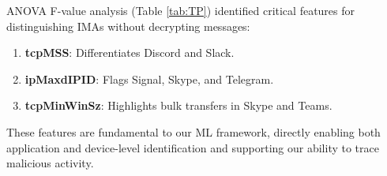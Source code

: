 \documentclass[conference]{IEEEtran}
\begin{document}
ANOVA F-value analysis (Table \ref{tab:TP}) identified critical features for distinguishing IMAs without decrypting messages: \begin{enumerate} 
    \item \textbf{tcpMSS}: Differentiates Discord and Slack. 
    \item \textbf{ipMaxdIPID}: Flags Signal, Skype, and Telegram. 
    \item \textbf{tcpMinWinSz}: Highlights bulk transfers in Skype and Teams. 
\end{enumerate} 
These features are fundamental to our ML framework, directly enabling both application and device-level identification and supporting our ability to trace malicious activity.

\begin{table}[!ht]
\centering
\caption{IMA Anova F-Value Top 5 Features}
\label{tab:TP}
\end{table}
\end{document}
